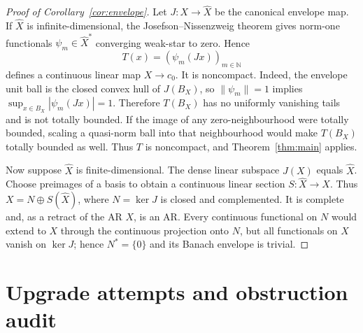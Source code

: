 \documentclass[11pt]{article}
\newcommand{\N}{\mathbb N}
\begin{document}
\begin{proof}[Proof of Corollary~\ref{cor:envelope}]
Let $J:X\to\widehat X$ be the canonical envelope map.  If $\widehat X$ is
infinite-dimensional, the Josefson--Nissenzweig theorem
\cite{Nissenzweig} gives norm-one functionals
$\psi_m\in\widehat X^*$ converging weak-star to zero.  Hence
\[
                    T(x)=(\psi_m(Jx))_{m\in\N}
\]
defines a continuous linear map $X\to c_0$.  It is noncompact.  Indeed, the
envelope unit ball is the closed convex hull of $J(B_X)$, so
$\|\psi_m\|=1$ implies
$\sup_{x\in B_X}|\psi_m(Jx)|=1$.  Therefore $T(B_X)$ has no uniformly
vanishing tails and is not totally bounded.  If the image of any
zero-neighbourhood were totally bounded, scaling a quasi-norm ball into that
neighbourhood would make $T(B_X)$ totally bounded as well.  Thus $T$ is
noncompact, and Theorem~\ref{thm:main} applies.

Now suppose $\widehat X$ is finite-dimensional.  The dense linear subspace
$J(X)$ equals $\widehat X$.  Choose preimages of a basis to obtain a
continuous linear section $S:\widehat X\to X$.  Thus
$X=N\oplus S(\widehat X)$, where $N=\ker J$ is closed and complemented.
It is complete and, as a retract of the AR $X$, is an AR.  Every continuous
functional on $N$ would extend to $X$ through the continuous projection onto
$N$, but all functionals on $X$ vanish on $\ker J$; hence $N^*=\{0\}$ and
its Banach envelope is trivial.
\end{proof}

\section{Upgrade attempts and obstruction audit}
\end{document}
